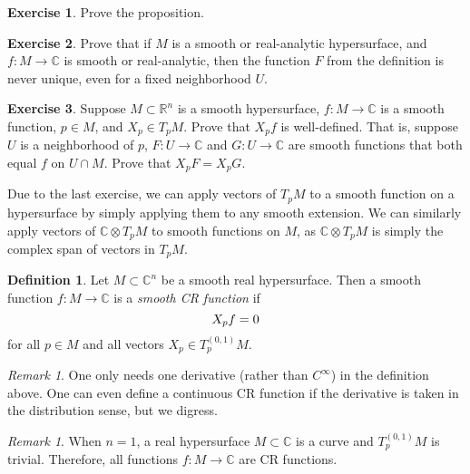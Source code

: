 \documentclass[12pt,openany]{book}
\newcommand{\avoidbreak}{\postdisplaypenalty=100}
\newcommand{\C}{{\mathbb{C}}}
\newcommand{\R}{{\mathbb{R}}}
\newcommand{\myindex}[1]{#1\index{#1}}
\theoremstyle{plain}
\theoremstyle{remark}
\newtheorem{remark}[thm]{Remark}
\theoremstyle{definition}
\newtheorem{defn}[thm]{Definition}
\newenvironment{exbox}{%
    \def\FrameCommand{\vrule width 1pt \relax\hspace{10pt}}%
    \MakeFramed {\advance \hsize -\width \FrameRestore}%
}{%
    \endMakeFramed
}
\theoremstyle{exercise}
\newtheorem{exercise}{Exercise}[section]
\theoremstyle{example}
\begin{document}
\begin{exbox}
\begin{exercise}
Prove the proposition.
\end{exercise}

\begin{exercise}
Prove that if $M$ is a smooth or real-analytic
hypersurface, and $f \colon M \to \C$ is smooth or real-analytic, then the function $F$ from the definition is never unique,
even for a fixed neighborhood $U$.
\end{exercise}

\begin{exercise}
Suppose $M \subset \R^n$ is a smooth hypersurface, $f \colon M \to \C$
is a smooth function, $p \in M$, and $X_p \in T_p M$.  Prove that
$X_p f$ is well-defined.
That is, suppose
$U$ is a neighborhood of $p$,
$F \colon U \to \C$ and $G \colon U \to \C$
are smooth functions that both equal $f$ on $U \cap M$.
Prove that
$X_p F = X_p G$.
\end{exercise}
\end{exbox}

Due to the last exercise, we can apply vectors of $T_p M$ to
a smooth function on a hypersurface by simply applying
them to any smooth extension.  We can similarly apply vectors of
$\C \otimes T_p M$ to smooth functions on $M$, as 
$\C \otimes T_p M$ is simply the complex span of vectors in $T_p M$.

\begin{defn}
Let $M \subset \C^n$ be a smooth real hypersurface.  Then
a smooth function $f \colon M \to \C$ is a
\emph{\myindex{smooth CR function}} if
\begin{equation*}
X_p f = 0
\avoidbreak
\end{equation*}
for all $p \in M$ and all vectors $X_p \in T^{(0,1)}_p M$.
\end{defn}

\begin{remark}
One only needs one derivative (rather than $C^\infty$) in the definition
above.
One can even
define a continuous CR function if the derivative is taken in the
distribution sense, but we digress.
\end{remark}

\begin{remark}
When $n=1$, a real hypersurface $M \subset \C$ is a curve and $T^{(0,1)}_p M$
is trivial.  Therefore, all functions $f \colon M \to \C$ are CR functions.
\end{remark}
\end{document}
